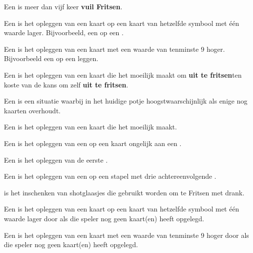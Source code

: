 
\item Een  is meer dan vijf keer \textbf{vuil Fritsen}\footnotemark[2].

\item Een  is het opleggen van een kaart op een kaart van hetzelfde symbool met \'e\'en waarde lager. Bijvoorbeeld, een  op een .

\item Een  is het opleggen van een kaart met een waarde van tenminste 9 hoger. Bijvoorbeeld een  op een  leggen.

\item Een  is het opleggen van een kaart die het \andereSpelers moeilijk maakt om \textbf{uit te fritsen}\footnotemark[3] ten koste van de kans om zelf \textbf{uit te fritsen}\footnotemark[3].

\item Een  is een situatie waarbij \eenSpeler in het huidige potje hoogstwaarschijnlijk als enige nog kaarten overhoudt.

\item Een  is het opleggen van een kaart die het \andereSpelers moeilijk maakt.

\item Een  is het opleggen van een  op een kaart ongelijk aan een .

\item Een  is het opleggen van de eerste .

\item Een  is het opleggen van een  op een stapel met drie achtereenvolgende .

\item {} is het inschenken van shotglaasjes die gebruikt worden om te Fritsen met drank.

\item Een  is het opleggen van een kaart op een kaart van hetzelfde symbool met \'e\'en waarde lager door \Willem als die speler nog geen kaart(en) heeft opgelegd.

\item Een  is het opleggen van een kaart met een waarde van tenminste 9 hoger door \Willem als die speler nog geen kaart(en) heeft opgelegd.

